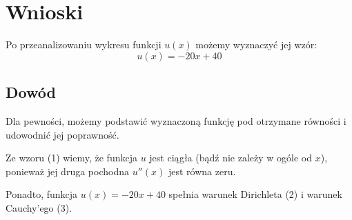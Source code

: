\documentclass[12pt]{article}
\begin{document}
\newpage
\section{Wnioski}
Po przeanalizowaniu wykresu funkcji $u(x)$ możemy wyznaczyć jej wzór:
\begin{equation}
	u(x) = -20x + 40
\end{equation}

\subsection{Dowód}
Dla pewności, możemy podstawić wyznaczoną funkcję pod otrzymane równości i udowodnić jej poprawność.

\noindent Ze wzoru (1) wiemy, że funkcja $u$ jest ciągła (bądź nie zależy w ogóle od $x$), 
ponieważ jej druga pochodna $u''(x)$ jest równa zeru.

\noindent Ponadto, funkcja $u(x)=-20x+40$ spełnia warunek Dirichleta (2) i warunek Cauchy'ego (3).
\end{document}
